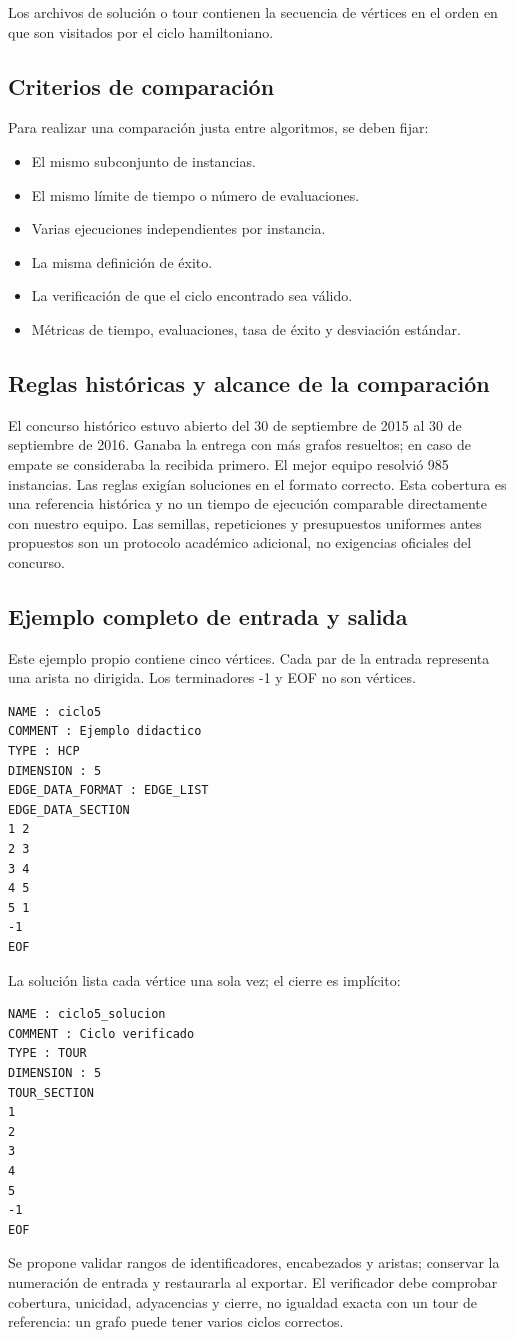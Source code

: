 Los archivos de solución o tour contienen la secuencia de vértices en el orden en que son visitados por el ciclo hamiltoniano. \cite{aco9}

\subsection{Criterios de comparación}

Para realizar una comparación justa entre algoritmos, se deben fijar:

\begin{itemize}
    \item El mismo subconjunto de instancias.
    \item El mismo límite de tiempo o número de evaluaciones.
    \item Varias ejecuciones independientes por instancia.
    \item La misma definición de éxito.
    \item La verificación de que el ciclo encontrado sea válido.
    \item Métricas de tiempo, evaluaciones, tasa de éxito y desviación estándar.
\end{itemize}


\subsection{Reglas históricas y alcance de la comparación}
El concurso histórico estuvo abierto del 30 de septiembre de 2015 al 30 de septiembre de 2016. Ganaba la entrega con más grafos resueltos; en caso de empate se consideraba la recibida primero. El mejor equipo resolvió 985 instancias. Las reglas exigían soluciones en el formato correcto. Esta cobertura es una referencia histórica y no un tiempo de ejecución comparable directamente con nuestro equipo. Las semillas, repeticiones y presupuestos uniformes antes propuestos son un protocolo académico adicional, no exigencias oficiales del concurso.\cite{aco9}

\subsection{Ejemplo completo de entrada y salida}
Este ejemplo propio contiene cinco vértices. Cada par de la entrada representa una arista no dirigida. Los terminadores -1 y EOF no son vértices.
\begin{verbatim}
NAME : ciclo5
COMMENT : Ejemplo didactico
TYPE : HCP
DIMENSION : 5
EDGE_DATA_FORMAT : EDGE_LIST
EDGE_DATA_SECTION
1 2
2 3
3 4
4 5
5 1
-1
EOF
\end{verbatim}
La solución lista cada vértice una sola vez; el cierre es implícito:
\begin{verbatim}
NAME : ciclo5_solucion
COMMENT : Ciclo verificado
TYPE : TOUR
DIMENSION : 5
TOUR_SECTION
1
2
3
4
5
-1
EOF
\end{verbatim}
Se propone validar rangos de identificadores, encabezados y aristas; conservar la numeración de entrada y restaurarla al exportar. El verificador debe comprobar cobertura, unicidad, adyacencias y cierre, no igualdad exacta con un tour de referencia: un grafo puede tener varios ciclos correctos.\cite{aco9}

